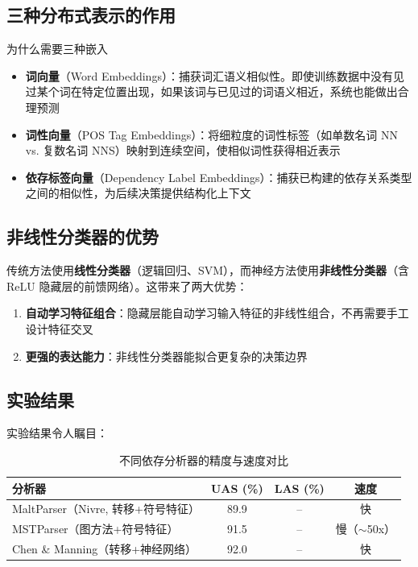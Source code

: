 \documentclass[a4paper]{article}
\begin{document}



\subsection{三种分布式表示的作用}

\begin{knowledgebox}{为什么需要三种嵌入}
\begin{itemize}
    \item \textbf{词向量}（Word Embeddings）：捕获词汇语义相似性。即使训练数据中没有见过某个词在特定位置出现，如果该词与已见过的词语义相近，系统也能做出合理预测
    \item \textbf{词性向量}（POS Tag Embeddings）：将细粒度的词性标签（如单数名词 NN vs. 复数名词 NNS）映射到连续空间，使相似词性获得相近表示
    \item \textbf{依存标签向量}（Dependency Label Embeddings）：捕获已构建的依存关系类型之间的相似性，为后续决策提供结构化上下文
\end{itemize}
\end{knowledgebox}

\subsection{非线性分类器的优势}

传统方法使用\textbf{线性分类器}（逻辑回归、SVM），而神经方法使用\textbf{非线性分类器}（含 ReLU 隐藏层的前馈网络）。这带来了两大优势：

\begin{enumerate}
    \item \textbf{自动学习特征组合}：隐藏层能自动学习输入特征的非线性组合，不再需要手工设计特征交叉
    \item \textbf{更强的表达能力}：非线性分类器能拟合更复杂的决策边界
\end{enumerate}

\subsection{实验结果}





实验结果令人瞩目：

\begin{table}[H]
\centering
\begin{tabular}{lccc}
\toprule
\textbf{分析器} & \textbf{UAS (\%)} & \textbf{LAS (\%)} & \textbf{速度} \\
\midrule
MaltParser（Nivre, 转移+符号特征） & 89.9 & -- & 快 \\
MSTParser（图方法+符号特征） & 91.5 & -- & 慢（$\sim$50x） \\
Chen \& Manning（转移+神经网络） & 92.0 & -- & 快 \\
\bottomrule
\end{tabular}
\caption{不同依存分析器的精度与速度对比}
\end{table}
\end{document}
